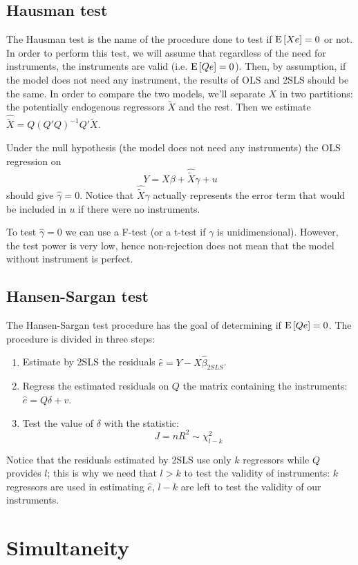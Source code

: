 \subsection{Hausman test}

The Hausman test is the name of the procedure done to test if $\operatorname{E}\left[Xe\right] =0$ or not. In order to perform this test, we will assume that regardless of the need for instruments, the instruments are valid (i.e. $\operatorname{E}\left[Qe\right] = 0$). Then, by assumption, if the model does not need any instrument, the results of OLS and 2SLS should be the same. In order to compare the two models, we'll separate $X$ in two partitions: the potentially endogenous regressors $\tilde X$ and the rest. Then we estimate $\hat{\tilde X} = Q(Q'Q)^{-1}Q'\tilde X$.

Under the null hypothesis (the model does not need any instruments) the OLS regression on $$Y = X\beta + \hat{\tilde X}\gamma + u $$ should give $\hat\gamma = 0$. Notice that $\hat{\tilde X}\gamma$ actually represents the error term that would be included in $u$ if there were no instruments.

To test $\hat\gamma = 0$ we can use a F-test (or a t-test if $\gamma$ is unidimensional). However, the test power is very low, hence non-rejection does not mean that the model without instrument is perfect.

\subsection{Hansen-Sargan test}

The Hansen-Sargan test procedure has the goal of determining if $\operatorname{E}\left[Qe\right] = 0$. The procedure is divided in three steps:\begin{enumerate}
\item Estimate by 2SLS the residuals $\hat e = Y - X\hat\beta_{2SLS}$.
\item Regress the estimated residuals on $Q$ the matrix containing the instruments: $\hat e = Q\delta + v $.
\item Test the value of $\delta$ with the statistic: $$J = nR^2 \sim \chi_{l-k}^2 $$
\end{enumerate}

Notice that the residuals estimated by 2SLS use only $k$ regressors while $Q$ provides $l$; this is why we need that $l>k$ to test the validity of instruments: $k$ regressors are used in estimating $\hat e$, $l-k$ are left to test the validity of our instruments.

\section{Simultaneity}

